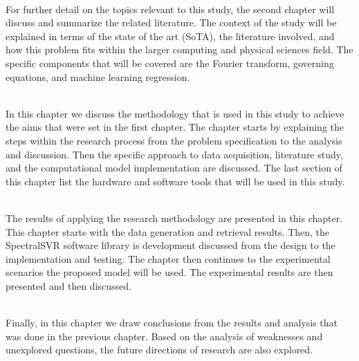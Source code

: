 \noindent{}\\
\noindent For further detail on the topics relevant to this study, the second chapter will discuss and summarize the related literature. The context of the study will be explained in terms of the state of the art (SoTA), the literature involved, and how this problem fits within the larger computing and physical sciences field. The specific components that will be covered are the Fourier transform, governing equations, and machine learning regression. 

\noindent{}\\
\noindent In this chapter we discuss the methodology that is used in this study to achieve the aims that were set in the first chapter. The chapter starts by explaining the steps within the research process from the problem specification to the analysis and discussion. Then the specific approach to data acquisition, literature study, and the computational model implementation are discussed. The last section of this chapter list the hardware and software tools that will be used in this study.

\noindent{}\\
\noindent The results of applying the research methodology are presented in this chapter. This chapter starts with the data generation and retrieval results. Then, the SpectralSVR software library is development discussed from the design to the implementation and testing. The chapter then continues to the experimental scenarios the proposed model will be used. The experimental results are then presented and then discussed.

\noindent{}\\
\noindent Finally, in this chapter we draw conclusions from the results and analysis that was done in the previous chapter. Based on the analysis of weaknesses and unexplored questions, the future directions of research are also explored.

